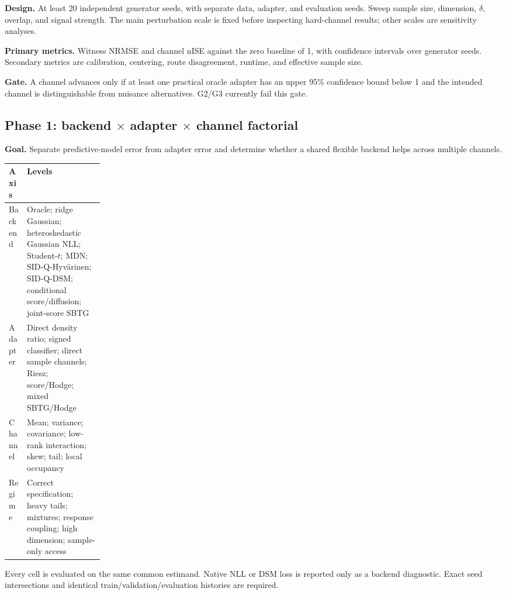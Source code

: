 \documentclass[10pt]{article}
\newcommand{\SIDQ}{\textnormal{\textsc{SID-Q}}\xspace}
\begin{document}
\textbf{Design.} At least 20 independent generator seeds, with separate data, adapter, and evaluation seeds. Sweep sample size, dimension, \(\delta\), overlap, and signal strength. The main perturbation scale is fixed before inspecting hard-channel results; other scales are sensitivity analyses.

\textbf{Primary metrics.} Witness NRMSE and channel nISE against the zero baseline of 1, with confidence intervals over generator seeds. Secondary metrics are calibration, centering, route disagreement, runtime, and effective sample size.

\textbf{Gate.} A channel advances only if at least one practical oracle adapter has an upper 95\% confidence bound below 1 and the intended channel is distinguishable from nuisance alternatives. G2/G3 currently fail this gate.

\subsection{Phase 1: backend \(\times\) adapter \(\times\) channel factorial}

\textbf{Goal.} Separate predictive-model error from adapter error and determine whether a shared flexible backend helps across multiple channels.

\begin{center}
\begin{tabularx}{\linewidth}{@{}p{0.19\linewidth}X@{}}
\toprule
Axis & Levels \\
\midrule
Backend & Oracle; ridge Gaussian; heteroskedastic Gaussian NLL; Student-\(t\); MDN; \SIDQ-Hyv\"arinen; \SIDQ-DSM; conditional score/diffusion; joint-score SBTG \\
Adapter & Direct density ratio; signed classifier; direct sample channels; Riesz; score/Hodge; mixed SBTG/Hodge \\
Channel & Mean; variance; covariance; low-rank interaction; skew; tail; local occupancy \\
Regime & Correct specification; heavy tails; mixtures; response coupling; high dimension; sample-only access \\
\bottomrule
\end{tabularx}
\end{center}

Every cell is evaluated on the same common estimand. Native NLL or DSM loss is reported only as a backend diagnostic. Exact seed intersections and identical train/validation/evaluation histories are required.
\end{document}
